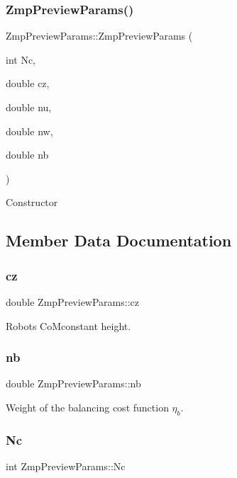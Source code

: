 \subsubsection{\texorpdfstring{Zmp\+Preview\+Params()}{ZmpPreviewParams()}}
{\footnotesize\ttfamily Zmp\+Preview\+Params\+::\+Zmp\+Preview\+Params (\begin{DoxyParamCaption}\item[{int}]{Nc,  }\item[{double}]{cz,  }\item[{double}]{nu,  }\item[{double}]{nw,  }\item[{double}]{nb }\end{DoxyParamCaption})\hspace{0.3cm}{\ttfamily [inline]}}

Constructor 

\subsection{Member Data Documentation}
\hypertarget{structZmpPreviewParams_a4bddbdd99f911c9dddfcb2445da1b7dc}{}\label{structZmpPreviewParams_a4bddbdd99f911c9dddfcb2445da1b7dc} 
\subsubsection{\texorpdfstring{cz}{cz}}
{\footnotesize\ttfamily double Zmp\+Preview\+Params\+::cz}

Robot\textquotesingle{}s Co\+Mconstant height. \hypertarget{structZmpPreviewParams_abaa39df27b9d8993a940e753b297dcea}{}\label{structZmpPreviewParams_abaa39df27b9d8993a940e753b297dcea} 
\subsubsection{\texorpdfstring{nb}{nb}}
{\footnotesize\ttfamily double Zmp\+Preview\+Params\+::nb}

Weight of the balancing cost function $ \eta_b $. \hypertarget{structZmpPreviewParams_adf022d12c133e9a17a41c1a9864fdef0}{}\label{structZmpPreviewParams_adf022d12c133e9a17a41c1a9864fdef0} 
\subsubsection{\texorpdfstring{Nc}{Nc}}
{\footnotesize\ttfamily int Zmp\+Preview\+Params\+::\+Nc}

